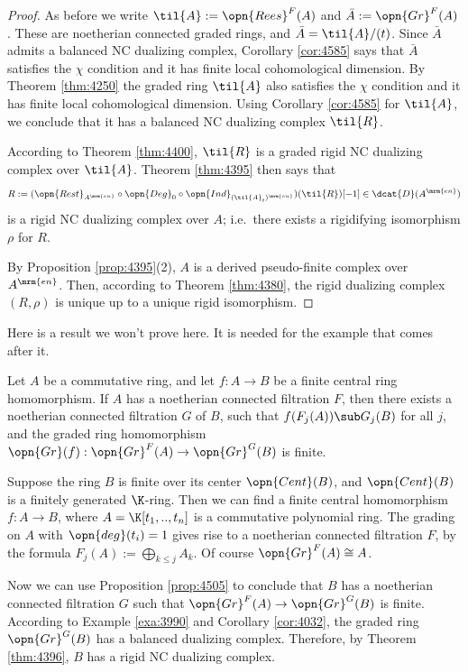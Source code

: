 \begin{proof}
As before we write $\til{A} := \opn{Rees}^F(A)$ and $\bar{A} := \opn{Gr}^F(A)$.
These are noetherian connected graded rings, and 
$\bar{A} = \til{A} / (t)$. Since $\bar{A}$ admits a balanced NC dualizing 
complex, Corollary \ref{cor:4585} says that $\bar{A}$ satisfies the $\chi$ 
condition and it has finite local cohomological dimension. 
By Theorem \ref{thm:4250} the graded ring $\til{A}$ also satisfies the $\chi$ 
condition and it has finite local cohomological dimension.
Using Corollary \ref{cor:4585} for $\til{A}$, we conclude that it has a 
balanced NC dualizing complex $\til{R}$. 

According to Theorem \ref{thm:4400}, $\til{R}$ is a graded rigid NC dualizing 
complex over $\til{A}$. Theorem \ref{thm:4395} then says that 
\[ R := (\opn{Rest}_{A^{\mrm{en}}} \circ \opn{Deg}_0 \circ 
\opn{Ind}_{(\til{A}_t)^{\mrm{en}}}) (\til{R})[-1] \in \dcat{D}(A^{\mrm{en}}) \]
is a rigid NC dualizing complex over $A$; i.e.\ there exists a rigidifying 
isomorphism $\rho$ for $R$. 

By Proposition \ref{prop:4395}(2), $A$ is a derived pseudo-finite complex over
$A^{\mrm{en}}$. Then, according to Theorem \ref{thm:4380}, the rigid dualizing 
complex $(R, \rho)$ is unique up to a unique rigid isomorphism.
\end{proof}

Here is a result we won't prove here. It is needed for the example that comes 
after it. 

\begin{prop}   \label{prop:4505}
Let $A$ be a commutative ring, and let $f : A \to B$ be a finite central ring 
homomorphism. If $A$ has a noetherian connected filtration $F$, then 
there exists a noetherian connected filtration $G$ of $B$, such that 
$f(F_j(A)) \sub G_j(B)$ for all $j$, and the graded ring homomorphism 
$\opn{Gr}(f) : \opn{Gr}^F(A) \to \opn{Gr}^G(B)$ 
is finite. 
\end{prop}

\begin{exa} \label{exa:4506}
Suppose the ring $B$ is finite over its center $\opn{Cent}(B)$, and 
$\opn{Cent}(B)$ is a finitely generated $\K$-ring. 
Then we can find a finite central homomorphism $f : A \to B$, where
$A =  \K[t_1, .., t_n]$ is a commutative polynomial ring. 
The grading on $A$ with $\opn{deg}(t_i) = 1$ gives rise to a noetherian 
connected filtration $F$, by the formula 
$F_j(A) := \bigoplus_{k \leq j} A_k$. Of course 
$\opn{Gr}^F(A) \cong A$. 

Now we can use Proposition \ref{prop:4505}
to conclude that $B$ has a noetherian connected filtration $G$ such that 
$\opn{Gr}^F(A) \to \opn{Gr}^G(B)$ is finite. According to Example \ref{exa:3990}
and Corollary \ref{cor:4032}, the 
graded ring $\opn{Gr}^G(B)$ has a balanced dualizing complex. 
Therefore, by Theorem \ref{thm:4396}, $B$ has a rigid NC dualizing complex. 
\end{exa}

